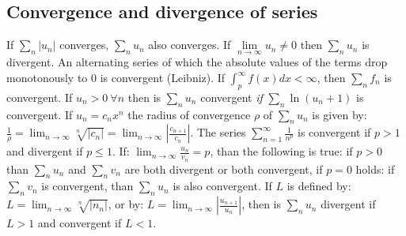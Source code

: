 \documentclass[a4paper,fancyheadings,twoside]{report}
\begin{document}
\subsection{Convergence and divergence of series}
If $\sum\limits_n|u_n|$ converges, $\sum\limits_n u_n$ also converges.
\npar
If $\lim\limits_{n\rightarrow\infty}u_n\neq0$ then $\sum\limits_n u_n$ is divergent.
\npar
An alternating series of which the absolute values of the terms drop
monotonously to 0 is convergent (Leibniz).
\npar
If $\int_p^{\infty}f(x)dx<\infty$, then $\sum\limits_n f_n$ is convergent.
\npar
If $u_n>0~\forall n$ then is $\sum\limits_n u_n$ convergent {\it if}
$\sum\limits_n\ln(u_n+1)$ is convergent.
\npar
If $u_n=c_nx^n$ the radius of convergence $\rho$ of
$\sum\limits_n u_n$ is given by:
$\displaystyle\frac{1}{\rho}=\lim_{n\rightarrow\infty}\sqrt[n]{|c_n|}=
\lim_{n\rightarrow\infty}\left|\frac{c_{n+1}}{c_n}\right|$.
\npar
The series $\displaystyle\sum_{n=1}^\infty \frac{1}{n^p}$ is convergent if
$p>1$ and divergent if $p\leq1$.
\npar
If: $\displaystyle\lim_{n\rightarrow\infty}\frac{u_n}{v_n}=p$,
than the following is true: if $p>0$ than $\sum\limits_{n}u_n$ and $\sum\limits_{n}v_n$
are both divergent or both convergent, if $p=0$ holds: if $\sum\limits_{n}v_n$
is convergent, than $\sum\limits_{n}u_n$ is also convergent.
\npar
If $L$ is defined by:
$\displaystyle L=\lim_{n\rightarrow\infty}\sqrt[n]{|n_n|}$, or by:
$\displaystyle L=\lim_{n\rightarrow\infty}\left|\frac{u_{n+1}}{u_n}\right|$,
then is $\sum\limits_{n}u_n$ divergent if $L>1$ and convergent if $L<1$.
\end{document}
